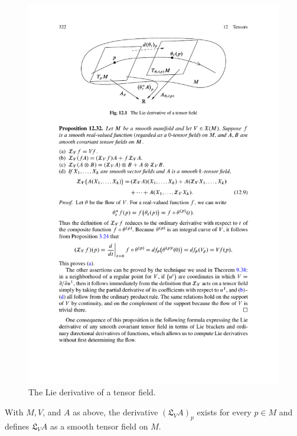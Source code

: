 \begin{figure}[htbp]
\centering
\includegraphics{pictures/Lie-derivative-tensor}
\caption{The Lie derivative of a tensor field.}
\end{figure}
\begin{lemma}
With $M,V$, and $A$ as above, the derivative $(\mathfrak{L}_VA)_p$ exists for every $p\in M$ and defines $\mathfrak{L}_VA$ as a smooth tensor field on $M$.
\end{lemma}
